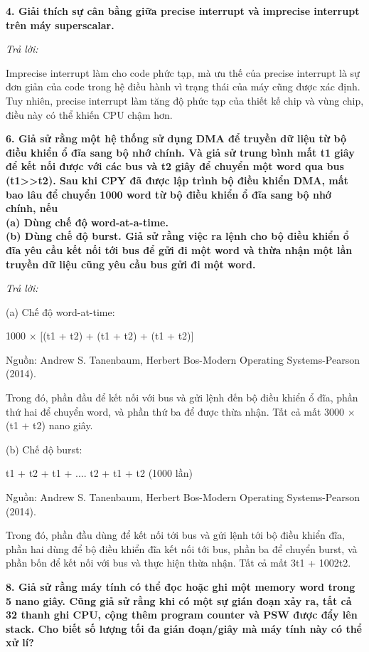 \documentclass{report}
\begin{document}
\bigskip
\textbf{4. Giải thích sự cân bằng giữa precise interrupt và imprecise interrupt trên máy superscalar.}

\bigskip
\textit{Trả lời:}

\smallskip
Imprecise interrupt làm cho code phức tạp, mà ưu thế của precise interrupt là sự đơn giản của code trong hệ điều hành vì trạng thái của máy cũng được xác định. Tuy nhiên, precise interrupt làm tăng độ phức tạp của thiết kế chip và vùng chip, điều này có thể khiến CPU chậm hơn.

\bigskip
\textbf{6. Giả sử rằng một hệ thống sử dụng DMA để truyền dữ liệu từ bộ điều khiển ổ đĩa sang bộ nhớ chính. Và giả sử trung bình mất t1 giây để kết nối được với các bus và t2 giây để chuyển một word qua bus (t1>>t2). Sau khi CPY đã được lập trình bộ điều khiển DMA, mất bao lâu để chuyển 1000 word từ bộ điều khiển ổ đĩa sang bộ nhớ chính, nếu\\
(a) Dùng chế độ word-at-a-time.\\
(b)	Dùng chế độ burst. Giả sử rằng việc ra lệnh cho bộ điều khiển ổ đĩa yêu cầu kết nối tới bus để gửi đi một word và thừa nhận một lần truyền dữ liệu cũng yêu cầu bus gửi đi một word.}

\bigskip
\textit{Trả lời:}

\smallskip
(a) Chế độ word-at-time:

\centerline{1000 $\times$ [(t1 + t2) + (t1 + t2) + (t1 + t2)]}
\changefontsizes{12pt}
\centerline{Nguồn: Andrew S. Tanenbaum, Herbert Bos-Modern Operating Systems-Pearson (2014).}
\changefontsizes{13pt}
\smallskip
Trong đó, phần đầu để kết nối với bus và gửi lệnh đến bộ điều khiển ổ đĩa, phần thứ hai để chuyển word, và phần thứ ba để được thừa nhận. Tất cả mất 3000 $\times$ (t1 + t2) nano giây.

\smallskip
(b) Chế dộ burst: 

\centerline{t1 + t2 + t1 + .... t2 + t1 + t2 (1000 lần)}
\changefontsizes{12pt}
\centerline{Nguồn: Andrew S. Tanenbaum, Herbert Bos-Modern Operating Systems-Pearson (2014).}
\changefontsizes{13pt}
\smallskip
Trong đó, phần đầu dùng để kết nối tới bus và gửi lệnh tới bộ điều khiển đĩa, phần hai dùng để bộ điều khiển đĩa kết nối tới bus, phần ba để chuyển burst, và phần bốn để kết nối với bus và thực hiện thừa nhận. Tất cả mất 3t1 + 1002t2.

\bigskip
\textbf{8. Giả sử rằng máy tính có thể đọc hoặc ghi một memory word trong 5 nano giây. Cũng giả sử rằng khi có một sự gián đoạn xảy ra, tất cả 32 thanh ghi CPU, cộng thêm program counter và PSW được đẩy lên stack. Cho biết số lượng tối đa gián đoạn/giây mà máy tính này có thể xử lí?}
\end{document}
